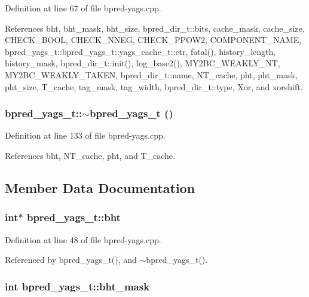 Definition at line 67 of file bpred-yags.cpp.

References bht, bht\_\-mask, bht\_\-size, bpred\_\-dir\_\-t::bits, cache\_\-mask, cache\_\-size, CHECK\_\-BOOL, CHECK\_\-NNEG, CHECK\_\-PPOW2, COMPONENT\_\-NAME, bpred\_\-yags\_\-t::bpred\_\-yags\_\-t::yags\_\-cache\_\-t::ctr, fatal(), history\_\-length, history\_\-mask, bpred\_\-dir\_\-t::init(), log\_\-base2(), MY2BC\_\-WEAKLY\_\-NT, MY2BC\_\-WEAKLY\_\-TAKEN, bpred\_\-dir\_\-t::name, NT\_\-cache, pht, pht\_\-mask, pht\_\-size, T\_\-cache, tag\_\-mask, tag\_\-width, bpred\_\-dir\_\-t::type, Xor, and xorshift.
\subsubsection[{$\sim$bpred\_\-yags\_\-t}]{\setlength{\rightskip}{0pt plus 5cm}bpred\_\-yags\_\-t::$\sim$bpred\_\-yags\_\-t ()\hspace{0.3cm}{\tt  [inline]}}\label{classbpred__yags__t_eee606c37e4548965dc80e2613f7ee4c}




Definition at line 133 of file bpred-yags.cpp.

References bht, NT\_\-cache, pht, and T\_\-cache.

\subsection{Member Data Documentation}
\subsubsection[{bht}]{\setlength{\rightskip}{0pt plus 5cm}int$\ast$ {\bf bpred\_\-yags\_\-t::bht}\hspace{0.3cm}{\tt  [protected]}}\label{classbpred__yags__t_2d320bfd11b859fd670c388883b6fac7}




Definition at line 48 of file bpred-yags.cpp.

Referenced by bpred\_\-yags\_\-t(), and $\sim$bpred\_\-yags\_\-t().
\subsubsection[{bht\_\-mask}]{\setlength{\rightskip}{0pt plus 5cm}int {\bf bpred\_\-yags\_\-t::bht\_\-mask}\hspace{0.3cm}{\tt  [protected]}}\label{classbpred__yags__t_a1c1e12e16da6313f5e083643b6ec6b4}




